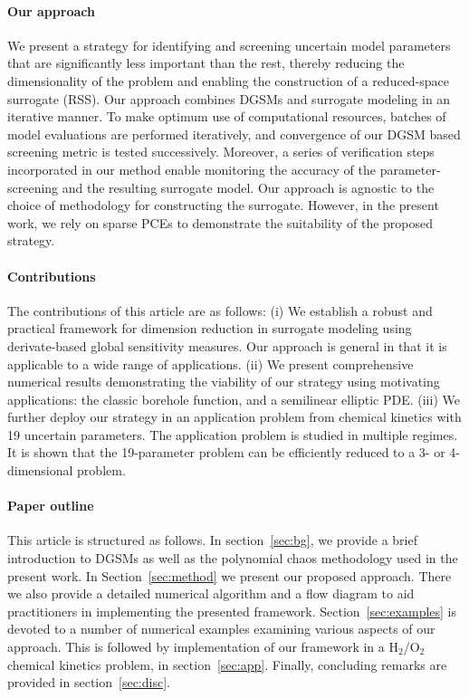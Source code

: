 \paragraph{Our approach}
We present a strategy for identifying and screening uncertain model parameters
that are significantly less important than the rest, thereby reducing the
dimensionality of the problem and enabling the construction of a reduced-space
surrogate (RSS).  Our approach combines DGSMs and surrogate modeling in an
iterative manner.  To make optimum use of computational resources, batches of
model evaluations are performed iteratively, and convergence of our DGSM based
screening metric is tested successively. Moreover, a series of verification steps
incorporated in our method enable monitoring the accuracy of the parameter-screening
and the resulting surrogate model.  Our approach is agnostic to the choice of
methodology for constructing the surrogate. However, in the present work, we
rely on sparse PCEs to demonstrate the suitability of the proposed strategy.  



\paragraph{Contributions}
The contributions of this article are as follows: (i) We establish a robust and
practical framework for dimension reduction in surrogate modeling using
derivate-based global sensitivity measures. Our
approach is general in that it is applicable to a wide range of applications.
(ii) We present comprehensive numerical results demonstrating the viability of
our strategy using motivating applications: the classic borehole
function, and a semilinear elliptic PDE.  (iii) We further
deploy our strategy in an application problem from chemical kinetics with 19
uncertain parameters. The application problem is studied in multiple regimes.
It is shown that the 19-parameter problem can be efficiently reduced to a 3- 
or 4-dimensional problem.

\paragraph{Paper outline}
This article is structured as follows. In section~\ref{sec:bg}, we provide a
brief introduction to DGSMs as well as the polynomial chaos methodology used in
the present work.  In Section~\ref{sec:method} we present our proposed
approach. There we also provide a detailed numerical algorithm and a flow
diagram to aid practitioners in implementing the presented framework.
Section~\ref{sec:examples} is devoted to a number of numerical examples
examining various aspects of our approach. This is followed by implementation
of our framework in a H$_2$/O$_2$ chemical kinetics problem, in section~\ref{sec:app}.
Finally, concluding remarks are provided in section~\ref{sec:disc}.


